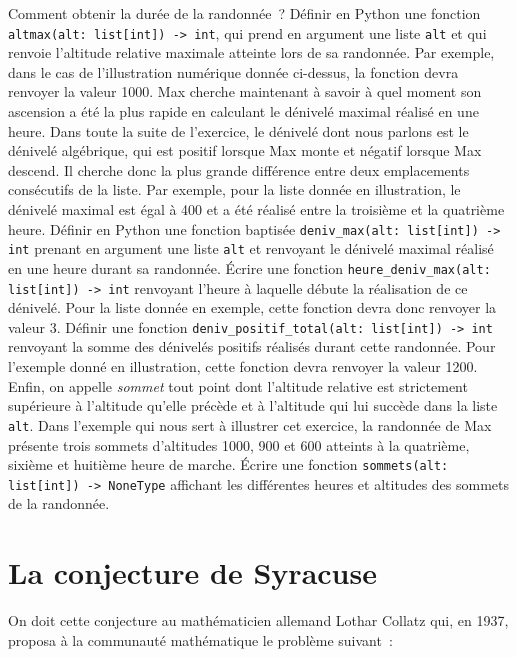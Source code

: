 \documentclass{magnolia}
\begin{document}
\begin{questions}
\question Comment obtenir la durée de la randonnée~? 
\question Définir en Python une fonction \verb!altmax(alt: list[int]) -> int!, qui prend en argument
  une liste \verb!alt! et qui renvoie l'altitude relative maximale atteinte lors de sa randonnée. Par
  exemple, dans le cas de l'illustration numérique donnée ci-dessus, la fonction devra renvoyer la
  valeur 1000.
\enonce Max cherche maintenant à savoir à quel moment son ascension a été la plus rapide en
  calculant le dénivelé maximal réalisé en une heure. Dans toute la suite de l'exercice,
  le dénivelé dont nous parlons est le dénivelé algébrique, qui est positif lorsque Max
  monte et négatif lorsque Max descend.  Il cherche donc la plus grande différence
  entre deux emplacements consécutifs de la liste. Par exemple, pour la liste donnée en illustration,
  le dénivelé maximal est égal à 400 et a été réalisé entre la troisième et la quatrième heure.
\question Définir en Python une fonction baptisée \verb!deniv_max(alt: list[int]) -> int! prenant
  en argument une liste \verb!alt! et renvoyant le dénivelé maximal réalisé en une heure durant
  sa randonnée. 
\question Écrire une fonction \verb!heure_deniv_max(alt: list[int]) -> int! renvoyant l'heure
  à laquelle débute la réalisation de ce dénivelé. Pour la liste donnée en exemple, cette fonction
  devra donc renvoyer la valeur 3.
\question Définir une fonction \verb!deniv_positif_total(alt: list[int]) -> int! renvoyant la somme des
  dénivelés positifs réalisés durant cette randonnée. Pour l'exemple donné en illustration, cette
  fonction devra renvoyer la valeur 1200.
\enonce Enfin, on appelle \emph{sommet} tout point dont l'altitude relative est strictement supérieure à
  l'altitude qu'elle précède et à l'altitude qui lui succède dans la liste \verb!alt!. Dans
  l'exemple qui nous sert à illustrer cet exercice, la randonnée de Max présente trois
  sommets d'altitudes 1000, 900 et 600 atteints à la quatrième, sixième et huitième heure de
  marche.
\question Écrire une fonction \verb!sommets(alt: list[int]) -> NoneType! affichant les
  différentes heures et altitudes des sommets de la randonnée.
\end{questions}

\section{La conjecture de Syracuse}

On doit cette conjecture au mathématicien allemand Lothar Collatz qui, en 1937, proposa à la
communauté mathématique le problème suivant~:\\
\end{document}
